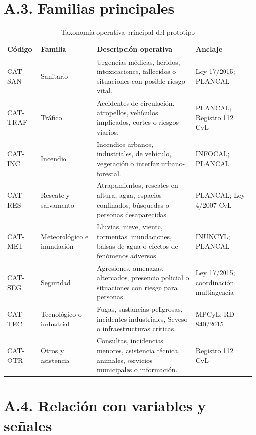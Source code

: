 \section*{A.3. Familias principales}

\begin{table}[ht]
\centering
\caption{Taxonomía operativa principal del prototipo}
\label{tab:anexoa-taxonomia}
\small
\begin{tabularx}{\textwidth}{|p{2.6cm}|p{3.0cm}|X|p{3.0cm}|}
\hline
\textbf{Código} & \textbf{Familia} & \textbf{Descripción operativa} & \textbf{Anclaje} \\ \hline
CAT-SAN & Sanitario & Urgencias médicas, heridos, intoxicaciones, fallecidos o situaciones con posible riesgo vital. & Ley 17/2015; PLANCAL \\ \hline
CAT-TRAF & Tráfico & Accidentes de circulación, atropellos, vehículos implicados, cortes o riesgos viarios. & PLANCAL; Registro 112 CyL \\ \hline
CAT-INC & Incendio & Incendios urbanos, industriales, de vehículo, vegetación o interfaz urbano-forestal. & INFOCAL; PLANCAL \\ \hline
CAT-RES & Rescate y salvamento & Atrapamientos, rescates en altura, agua, espacios confinados, búsquedas o personas desaparecidas. & PLANCAL; Ley 4/2007 CyL \\ \hline
CAT-MET & Meteorológico e inundación & Lluvias, nieve, viento, tormentas, inundaciones, balsas de agua o efectos de fenómenos adversos. & INUNCYL; PLANCAL \\ \hline
CAT-SEG & Seguridad & Agresiones, amenazas, altercados, presencia policial o situaciones con riesgo para personas. & Ley 17/2015; coordinación multiagencia \\ \hline
CAT-TEC & Tecnológico o industrial & Fugas, sustancias peligrosas, incidentes industriales, Seveso o infraestructuras críticas. & MPCyL; RD 840/2015 \\ \hline
CAT-OTR & Otros y asistencia & Consultas, incidencias menores, asistencia técnica, animales, servicios municipales o información. & Registro 112 CyL \\ \hline
\end{tabularx}
\end{table}

\section*{A.4. Relación con variables y señales}

